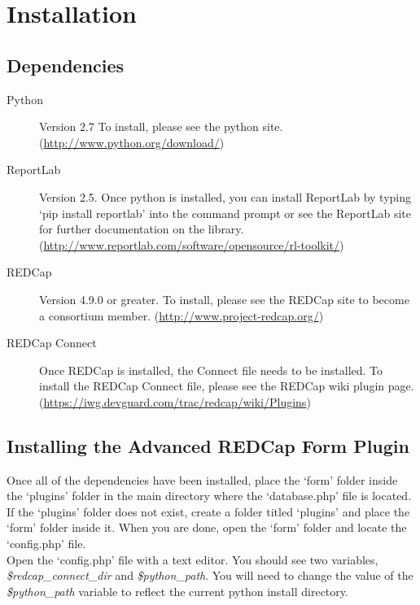 \documentclass[12pt]{article}
\begin{document}
\section{Installation}
    \subsection{Dependencies}
        \begin{description}
             \item[Python] Version 2.7 To install, please see the python site. (\url{http://www.python.org/download/})
             \item[ReportLab] Version 2.5. Once python is installed, you can install ReportLab by typing `pip install reportlab' into the command prompt or see the ReportLab site for further documentation on the library. (\url{http://www.reportlab.com/software/opensource/rl-toolkit/}) 
             \item[REDCap] Version 4.9.0 or greater. To install, please see the REDCap site to become a consortium member. (\url{http://www.project-redcap.org/})
             \item[REDCap Connect] Once REDCap is installed, the Connect file needs to be installed. To install the REDCap Connect file, please see the REDCap wiki plugin page. (\url{https://iwg.devguard.com/trac/redcap/wiki/Plugins})
         \end{description}

    \subsection{Installing the Advanced REDCap Form Plugin}
     	Once all of the dependencies have been installed, place the `form' folder inside the `plugins' folder in the main directory where the `database.php' file is located. If the `plugins' folder does not exist, create a folder titled `plugins' and place the `form' folder inside it. When you are done, open the `form' folder and locate the `config.php' file.
\\

	Open the `config.php' file with a text editor. You should see two variables, \textit{\$redcap\_connect\_dir} and \textit{\$python\_path}. You will need to change the value of the \textit{\$python\_path} variable to reflect the current python install directory. 
\\
\end{document}
